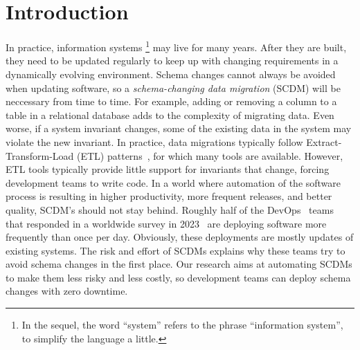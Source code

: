 \documentclass[runningheads]{llncs}
\def\define#1{\label{dfn:#1}{\em #1}\index{#1}}
\begin{document}
\section{Introduction}
\label{sct:Introduction}
   In practice, information systems%
   \footnote{In the sequel, the word ``system'' refers to the phrase ``information system'', to simplify the language a little.}
   may live for many years.
   After they are built, they need to be updated regularly to keep up with changing requirements in a dynamically evolving environment.
   Schema changes cannot always be avoided when updating software, so a \define{schema-changing data migration} (SCDM) will be neccessary from time to time.
   For example, adding or removing a column to a table in a relational database adds to the complexity of migrating data.
   Even worse, if a system invariant changes, some of the existing data in the system may violate the new invariant.
   In practice, data migrations typically follow Extract-Transform-Load (ETL) patterns~\cite{Theodorou2017},
   for which many tools are available.
   However, ETL tools typically provide little support for invariants that change, forcing development teams to write code.
   In a world where automation of the software process is resulting in higher productivity, more frequent releases, and better quality,
   SCDM's should not stay behind.
   Roughly half of the DevOps~\cite{BassWeberZhu15} teams that responded in a worldwide survey in 2023~\cite{HumanitecDevOps2023} are deploying software more frequently than once per day.
   Obviously, these deployments are mostly updates of existing systems.
   The risk and effort of SCDMs explains why these teams try to avoid schema changes in the first place.
   Our research aims at automating SCDMs to make them less risky and less costly,
   so development teams can deploy schema changes with zero downtime.
\end{document}
